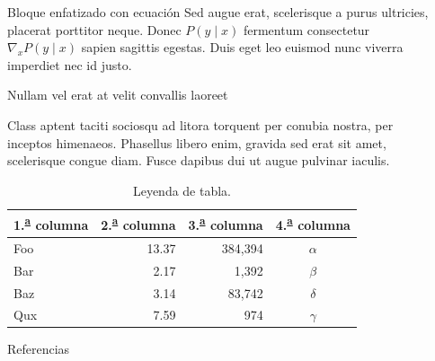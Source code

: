 \documentclass[final]{beamer}
\newlength{\sepwidth}
\newlength{\colwidth}
\newcommand{\separatorcolumn}{\begin{column}{\sepwidth}\end{column}}
\begin{document}
\begin{frame}[t]
\begin{columns}[t]
\begin{column}{\colwidth}
\begin{exampleblock}{Bloque enfatizado con ecuación}
    Sed augue erat, scelerisque a purus ultricies, placerat porttitor neque.
    Donec $P(y \mid x)$ fermentum consectetur $\nabla_x P(y \mid x)$ sapien
    sagittis egestas. Duis eget leo euismod nunc viverra imperdiet nec id
    justo.

  \end{exampleblock}

  \begin{block}{Nullam vel erat at velit convallis laoreet}

    Class aptent taciti sociosqu ad litora torquent per conubia nostra, per
    inceptos himenaeos. Phasellus libero enim, gravida sed erat sit amet,
    scelerisque congue diam. Fusce dapibus dui ut augue pulvinar iaculis.

    \begin{table}
      \centering
      \begin{tabular}{l r r c}
        \toprule
        \textbf{1.\textsuperscript{\underline{a}} columna} & \textbf{2.\textsuperscript{\underline{a}} columna} & \textbf{3.\textsuperscript{\underline{a}} columna} & \textbf{4.\textsuperscript{\underline{a}} columna} \\
        \midrule
        Foo & 13.37 & 384,394 & $\alpha$ \\
        Bar & 2.17 & 1,392 & $\beta$ \\
        Baz & 3.14 & 83,742 & $\delta$ \\
        Qux & 7.59 & 974 & $\gamma$ \\
        \bottomrule
      \end{tabular}
      \caption{Leyenda de tabla.}
    \end{table}


  \end{block}

  \begin{block}{Referencias}

    \nocite{*}
    \footnotesize{}

  \end{block}

\end{column}

\separatorcolumn
\end{columns}
\end{frame}
\end{document}
